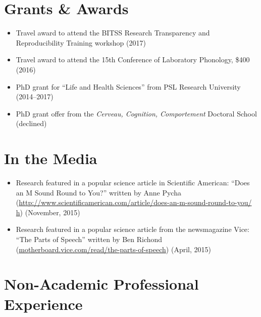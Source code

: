 \documentclass[a4paper, 10pt]{article}
\begin{document}
\section*{Grants \& Awards}

\begin{itemize}
\RaggedRight

\item Travel award to attend the BITSS Research Transparency and
  Reproducibility Training workshop (2017)

\item Travel award to attend the 15th Conference of Laboratory
  Phonology, \$400 (2016)

\item PhD grant for \enquote{Life and Health Sciences} from 
  {PSL} Research University (2014--2017)

\item PhD grant offer from the \emph{Cerveau, Cognition, Comportement}
  Doctoral School (declined)




\end{itemize}


\section*{In the Media}

\begin{itemize}

\item Research featured in a popular science article in Scientific American: \enquote{Does an M Sound Round to You?} written by Anne Pycha (\url{http://www.scientificamerican.com/article/does-an-m-sound-round-to-you/
h})  (November, 2015)

\item Research featured in a popular science article from the
  newsmagazine Vice: \enquote{The Parts of Speech} written by Ben
  Richond (\url{motherboard.vice.com/read/the-parts-of-speech})
  (April, 2015)

\end{itemize}




\iffalse

\section*{Non-Academic Professional Experience}
\end{document}
